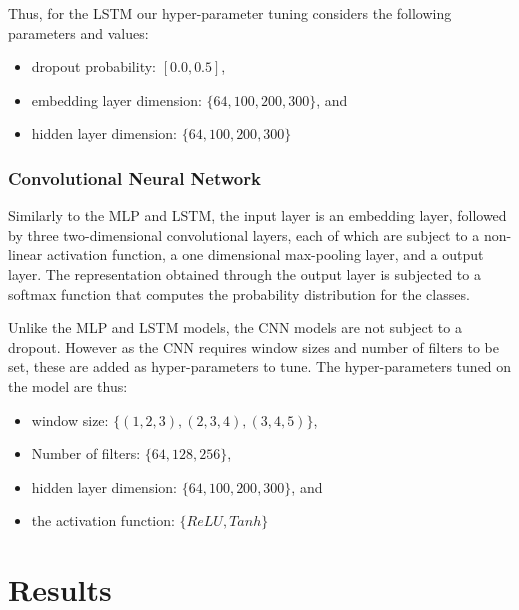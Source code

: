 Thus, for the LSTM our hyper-parameter tuning considers the following parameters and values:

\begin{itemize}
  \item dropout probability: $[0.0, 0.5]$,
  \item embedding layer dimension: $\{64, 100, 200, 300\}$, and
  \item hidden layer dimension: $\{64, 100, 200, 300\}$
\end{itemize}

\subsubsection{Convolutional Neural Network}
Similarly to the MLP and LSTM, the input layer is an embedding layer, followed by three two-dimensional convolutional layers, each of which are subject to a non-linear activation function, a one dimensional max-pooling layer, and a output layer. The representation obtained through the output layer is subjected to a softmax function that computes the probability distribution for the classes.


Unlike the MLP and LSTM models, the CNN models are not subject to a dropout. 
However as the CNN requires window sizes and number of filters to be set, these are added as hyper-parameters to tune. The hyper-parameters tuned on the model are thus:

\begin{itemize}
  \item window size: $\{(1, 2, 3), (2, 3, 4), (3, 4, 5)\}$,
  \item Number of filters: $\{64, 128, 256\}$,
  \item hidden layer dimension: $\{64, 100, 200, 300\}$, and
  \item the activation function: $\{ReLU, Tanh\}$
\end{itemize}

\section{Results}


